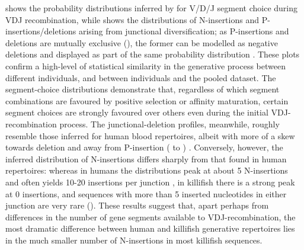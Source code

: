  shows the probability distributions inferred by  for V/D/J segment choice during VDJ recombination, while  shows the distributions of N-insertions and P-insertions/deletions arising from junctional diversification; as P-insertions and deletions are mutually exclusive (), the former can be modelled as negative deletions and displayed as part of the same probability distribution \parencite{elhanati2015model}. These plots confirm a high-level of statistical similarity in the generative process between different individuals, and between individuals and the pooled dataset. The segment-choice distributions demonstrate that, regardless of which segment combinations are favoured by positive selection or affinity maturation, certain segment choices are strongly favoured over others even during the initial VDJ-recombination process. The junctional-deletion profiles, meanwhile, roughly resemble those inferred for human blood repertoires, albeit with more of a skew towards deletion and away from P-insertion ( to ) \parencite{elhanati2015model}. Conversely, however, the inferred distribution of N-insertions differs sharply from that found in human repertoires: whereas in humans the distributions peak at about 5 N-insertions and often yields 10-20 insertions per junction \parencite{elhanati2015model}, in killifish there is a strong peak at 0 insertions, and sequences with more than 5 inserted nucleotides in either junction are very rare (). These results suggest that, apart perhaps from differences in the number of gene segments available to VDJ-recombination, the most dramatic difference between human and killifish generative repertoires lies in the much smaller number of N-insertions in most killifish sequences.


